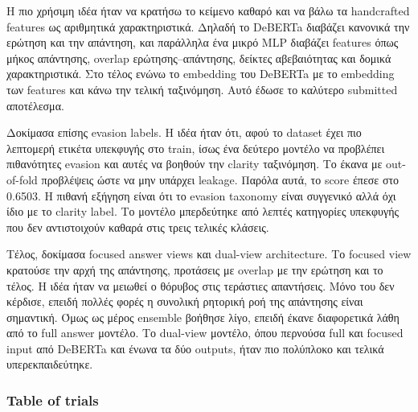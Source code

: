 \documentclass[12pt]{fphw}
\begin{document}
Η πιο χρήσιμη ιδέα ήταν να κρατήσω το κείμενο καθαρό και να βάλω τα handcrafted features ως αριθμητικά χαρακτηριστικά. Δηλαδή το DeBERTa διαβάζει κανονικά την ερώτηση και την απάντηση, και παράλληλα ένα μικρό MLP διαβάζει features όπως μήκος απάντησης, overlap ερώτησης--απάντησης, δείκτες αβεβαιότητας και δομικά χαρακτηριστικά. Στο τέλος ενώνω το embedding του DeBERTa με το embedding των features και κάνω την τελική ταξινόμηση. Αυτό έδωσε το καλύτερο submitted αποτέλεσμα.

Δοκίμασα επίσης evasion labels. Η ιδέα ήταν ότι, αφού το dataset έχει πιο λεπτομερή ετικέτα υπεκφυγής στο train, ίσως ένα δεύτερο μοντέλο να προβλέπει πιθανότητες evasion και αυτές να βοηθούν την clarity ταξινόμηση. Το έκανα με out-of-fold προβλέψεις ώστε να μην υπάρχει leakage. Παρόλα αυτά, το score έπεσε στο 0.6503. Η πιθανή εξήγηση είναι ότι το evasion taxonomy είναι συγγενικό αλλά όχι ίδιο με το clarity label. Το μοντέλο μπερδεύτηκε από λεπτές κατηγορίες υπεκφυγής που δεν αντιστοιχούν καθαρά στις τρεις τελικές κλάσεις.

Τέλος, δοκίμασα focused answer views και dual-view architecture. Το focused view κρατούσε την αρχή της απάντησης, προτάσεις με overlap με την ερώτηση και το τέλος. Η ιδέα ήταν να μειωθεί ο θόρυβος στις τεράστιες απαντήσεις. Μόνο του δεν κέρδισε, επειδή πολλές φορές η συνολική ρητορική ροή της απάντησης είναι σημαντική. Όμως ως μέρος ensemble βοήθησε λίγο, επειδή έκανε διαφορετικά λάθη από το full answer μοντέλο. Το dual-view μοντέλο, όπου περνούσα full και focused input από DeBERTa και ένωνα τα δύο outputs, ήταν πιο πολύπλοκο και τελικά υπερεκπαιδεύτηκε.

\subsubsection{Table of trials}
\end{document}
